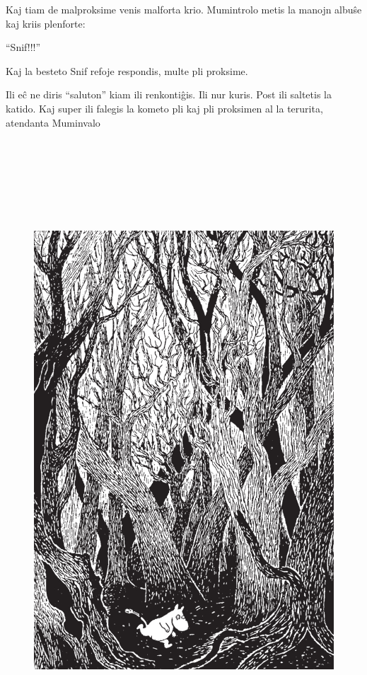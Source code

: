 Kaj tiam de malproksime venis malforta krio. Mumintrolo metis la manojn albuŝe kaj kriis plenforte:

``Snif!!!''

Kaj la besteto Snif refoje respondis, multe pli proksime.

Ili eĉ ne diris ``saluton'' kiam ili renkontiĝis. Ili nur kuris. Post ili saltetis la katido. Kaj super ili falegis la kometo pli kaj pli proksimen al la terurita, atendanta Muminvalo

\begin{figure}[htbp]
\centering
\includegraphics[width=450pt,height=658pt]{9-10.png}
\caption{}
\label{9-10}
\end{figure}

